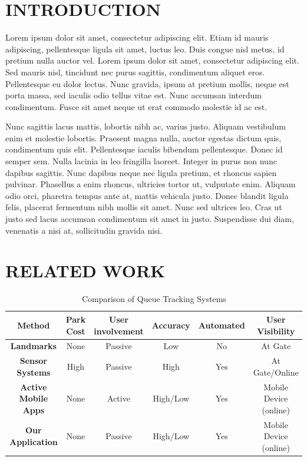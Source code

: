 \documentclass{sig-alternate}
\begin{document}
\section{INTRODUCTION}
Lorem ipsum dolor sit amet, consectetur adipiscing elit. Etiam id mauris adipiscing, pellentesque ligula sit amet, luctus leo. 
Duis congue nisl metus, id pretium nulla auctor vel. Lorem ipsum dolor sit amet, consectetur adipiscing elit. Sed mauris nisl, 
tincidunt nec purus sagittis, condimentum aliquet eros. Pellentesque eu dolor lectus. Nunc gravida, ipsum at pretium mollis, neque 
est porta massa, sed iaculis odio tellus vitae est. Nunc accumsan interdum condimentum. Fusce sit amet neque ut erat commodo molestie id ac est.

Nunc sagittis lacus mattis, lobortis nibh ac, varius justo. Aliquam vestibulum enim et molestie lobortis. Praesent magna nulla, auctor
egestas dictum quis, condimentum quis elit. Pellentesque iaculis bibendum pellentesque. Donec id semper sem. Nulla lacinia in leo fringilla 
laoreet. Integer in purus non nunc dapibus sagittis. Nunc dapibus neque nec ligula pretium, et rhoncus sapien pulvinar. Phasellus a enim rhoncus,
 ultricies tortor ut, vulputate enim. Aliquam odio orci, pharetra tempus ante at, mattis vehicula justo. Donec blandit ligula felis, placerat 
 fermentum nibh mollis sit amet. Nunc sed ultrices leo. Cras ut justo sed lacus accumsan condimentum sit amet in justo. Suspendisse dui diam, 
 venenatis a nisi at, sollicitudin gravida nisi.
 
\section{RELATED WORK}
\label{sec:related}

\begin{table}
\centering
\begin{tabular}{|>{\bfseries}c|c|c|c|c|c|} \hline
\textbf{Method}    &    \textbf{Park Cost}    &    \textbf{User involvement}    &    \textbf{Accuracy}    &    \textbf{Automated}    &    \textbf{User Visibility}\\ \hline
Landmarks    &    None    &    Passive    &    Low    &    No    &    At Gate\\ \hline
Sensor Systems    &    High    &    Passive    &    High    &    Yes    &    At Gate/Online\\ \hline
Active Mobile Apps    &    None    &    Active    &    High/Low    &    Yes    &    Mobile Device (online)\\ \hline
Our Application    &    None    &    Passive    &    High/Low    &    Yes    &    Mobile Device (online)\\ \hline
\end{tabular}
\caption{Comparison of Queue Tracking Systems}
\label{tab:related_work}
\end{table}
\end{document}
